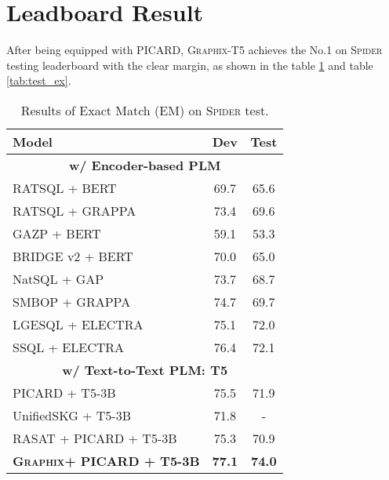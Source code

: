 \documentclass[letterpaper]{article} \usepackage{aaai23}  \usepackage{times}  \usepackage{helvet}  \usepackage{courier}  \usepackage[hyphens]{url}  \usepackage{graphicx} \usepackage{amsmath}
\newcommand{\graphix}{\textsc{Graphix}\xspace}
\newcommand{\spider}{\textsc{Spider}\xspace}
\begin{document}
\section{Leadboard Result}
After being equipped with PICARD, \graphix-T5 achieves the No.1 on \spider testing leaderboard with the clear margin, as shown in the table \ref{tab:test_em} and table \ref{tab:test_ex}.
\begin{table}[h]
\centering 
    \begin{tabular}{l|cc}
    \toprule
    \textbf{Model} & \textbf{Dev} & \textbf{Test} \\
    \midrule\midrule
    \multicolumn{3}{c}{\textbf{w/ Encoder-based PLM}} \\
    \midrule
    RATSQL + BERT & 69.7 & 65.6 \\
    RATSQL + GRAPPA & 73.4  & 69.6 \\
    GAZP + BERT & 59.1 & 53.3 \\
    BRIDGE v2 + BERT & 70.0  & 65.0  \\
    NatSQL + GAP & 73.7  & 68.7 \\
    SMBOP + GRAPPA & 74.7 & 69.7 \\
    LGESQL + ELECTRA & 75.1 & 72.0 \\
    SSQL + ELECTRA & 76.4 & 72.1 \\
    \midrule\midrule
    \multicolumn{3}{c}{\textbf{w/ Text-to-Text PLM: \textsc{T5}}} \\
    \midrule
    PICARD + T5-3B & 75.5  & 71.9  \\
    UnifiedSKG + T5-3B & 71.8 & - \\
    RASAT + PICARD + T5-3B & 75.3  & 70.9 \\
    \midrule
    \textbf{\graphix + PICARD + T5-3B} & \textbf{77.1} & \textbf{74.0} \\
    \bottomrule
    \end{tabular}\caption{Results of Exact Match (EM) on \textsc{Spider} test.}
  \label{tab:test_em}
\end{table}
\end{document}
